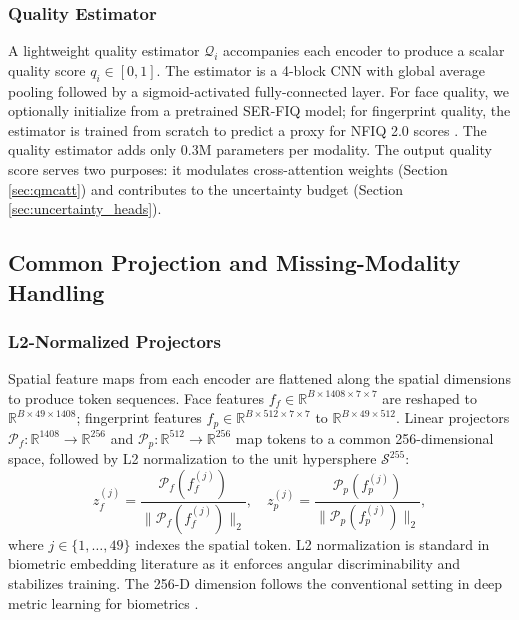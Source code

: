\documentclass[10pt,journal,compsoc]{IEEEtran}
\begin{document}
\subsubsection{Quality Estimator}

A lightweight quality estimator $\mathcal{Q}_i$ accompanies each encoder to produce a scalar quality score $q_i \in [0, 1]$. The estimator is a 4-block CNN with global average pooling followed by a sigmoid-activated fully-connected layer. For face quality, we optionally initialize from a pretrained SER-FIQ \cite{terhorst2020serfiq} model; for fingerprint quality, the estimator is trained from scratch to predict a proxy for NFIQ 2.0 scores \cite{tabassi2021nist}. The quality estimator adds only 0.3M parameters per modality. The output quality score serves two purposes: it modulates cross-attention weights (Section \ref{sec:qmcatt}) and contributes to the uncertainty budget (Section \ref{sec:uncertainty_heads}).

\subsection{Common Projection and Missing-Modality Handling}
\label{sec:projection_missing}

\subsubsection{L2-Normalized Projectors}

Spatial feature maps from each encoder are flattened along the spatial dimensions to produce token sequences. Face features $f_f \in \mathbb{R}^{B \times 1408 \times 7 \times 7}$ are reshaped to $\mathbb{R}^{B \times 49 \times 1408}$; fingerprint features $f_p \in \mathbb{R}^{B \times 512 \times 7 \times 7}$ to $\mathbb{R}^{B \times 49 \times 512}$. Linear projectors $\mathcal{P}_f: \mathbb{R}^{1408} \rightarrow \mathbb{R}^{256}$ and $\mathcal{P}_p: \mathbb{R}^{512} \rightarrow \mathbb{R}^{256}$ map tokens to a common 256-dimensional space, followed by L2 normalization to the unit hypersphere $\mathcal{S}^{255}$:
\begin{equation}
\label{eq:projection}
z_f^{(j)} = \frac{\mathcal{P}_f(f_f^{(j)})}{\|\mathcal{P}_f(f_f^{(j)})\|_2}, \quad z_p^{(j)} = \frac{\mathcal{P}_p(f_p^{(j)})}{\|\mathcal{P}_p(f_p^{(j)})\|_2},
\end{equation}
where $j \in \{1, \dots, 49\}$ indexes the spatial token. L2 normalization is standard in biometric embedding literature \cite{deng2019arcface, kim2022adaface} as it enforces angular discriminability and stabilizes training. The 256-D dimension follows the conventional setting in deep metric learning for biometrics \cite{grosz2024afrnet, qiu2024ifvit}.
\end{document}

